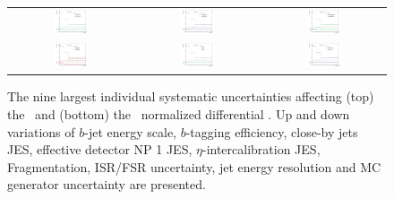 \begin{figure}[!tpb]
\begin{center}
\begin{tabular}{ccc}
\includegraphics[width=0.30\textwidth]{Modeling/Figures/ttbarPt/ttbarPt_effdetset1jes} & %
\includegraphics[width=0.30\textwidth]{Modeling/Figures/ttbarPt/ttbarPt_etacalibjes} & %
\includegraphics[width=0.30\textwidth]{Modeling/Figures/ttbarPt/ttbarPt_fragment} \\ 
\includegraphics[width=0.30\textwidth]{Modeling/Figures/ttbarPt/ttbarPt_isrfsr} & %
\includegraphics[width=0.30\textwidth]{Modeling/Figures/ttbarPt/ttbarPt_jer} & %
\includegraphics[width=0.30\textwidth]{Modeling/Figures/ttbarPt/ttbarPt_mcgen} \\ 
\end{tabular}%
\end{center}
\caption{The nine largest individual systematic uncertainties affecting (top) the \toppt\ and (bottom) the \ttbarpt\ normalized differential \xsec. 
  Up and down variations of $b$-jet energy scale, $b$-tagging efficiency, close-by jets JES, effective detector
NP 1 JES, $\eta$-intercalibration JES, Fragmentation, ISR/FSR uncertainty,
jet energy resolution and MC generator uncertainty are presented.}
\label{fig:error_toppt_ttbarpt}
\end{figure}


